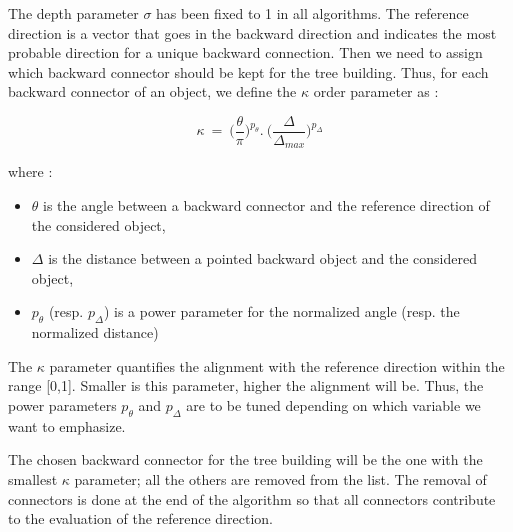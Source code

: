 \documentclass[cits]{JINST}
\begin{document}
The depth parameter $\sigma$ has been fixed to 1 in all algorithms. The reference direction is a vector that goes in the backward direction and indicates the most probable direction for a unique backward connection. Then we need to assign which backward connector should be kept for the tree building. Thus, for each backward connector of an object, we define the $\kappa$ order parameter as :

\begin{equation}
  \kappa~=~\Big(\frac{\theta}{\pi}\Big)^{p_{\theta}} . ~\Big(\frac{\Delta}{\Delta_{max}}\Big)^{p_{\Delta}} 
\end{equation}

where :

\begin{itemize}
  \item $\theta$ is the angle between a backward connector and the reference direction of the considered object,
  \item $\Delta$ is the distance between a pointed backward object and the considered object,
  \item $p_{\theta}$ (resp. $p_{\Delta}$) is a power parameter for the normalized angle (resp. the normalized distance)
\end{itemize}

The $\kappa$ parameter quantifies the alignment with the reference direction within the range [0,1]. Smaller is this parameter, higher the alignment will be. Thus, the power parameters $p_{\theta}$ and $p_{\Delta}$ are to be tuned depending on which variable we want to emphasize.

The chosen backward connector for the tree building will be the one with the smallest $\kappa$ parameter; all the others are removed from the list. The removal of connectors is done at the end of the algorithm so that all connectors contribute to the evaluation of the reference direction.
\end{document}
